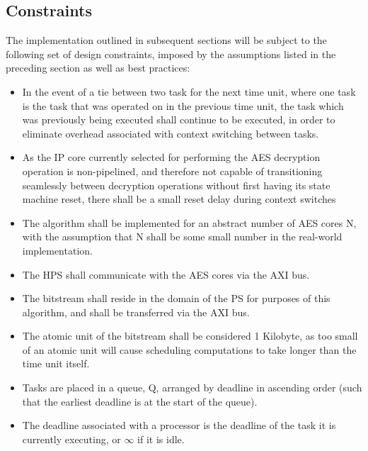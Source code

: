 \subsection{Constraints}\label{subsec:EDFConstraints}
The implementation outlined in subsequent sections will be subject to the following set of design constraints, imposed by the assumptions listed in the preceding section as well as best practices:
\begin{itemize}
    \item In the event of a tie between two task for the next time unit, where one task is the task that was operated on in the previous time unit, the task which was previously being executed shall continue to be executed, in order to eliminate overhead associated with context switching between tasks.
    \item As the IP core currently selected for performing the AES decryption operation is non-pipelined, and therefore not capable of transitioning seamlessly between decryption operations without first having its state machine reset, there shall be a small reset delay during context switches
    \item The algorithm shall be implemented for an abstract number of AES cores N, with the assumption that N shall be some small number in the real-world implementation.
    \item The HPS shall communicate with the AES cores via the AXI bus.
    \item The bitstream shall reside in the domain of the PS for purposes of this algorithm, and shall be transferred via the AXI bus.
    \item The atomic unit of the bitstream shall be considered 1 Kilobyte, as too small of an atomic unit will cause scheduling computations to take longer than the time unit itself.
    \item Tasks are placed in a queue, Q, arranged by deadline in ascending order (such that the earliest deadline is at the start of the queue). 
    \item The deadline associated with a processor is the deadline of the task it is currently executing, or $\infty$ if it is idle.
\end{itemize}

